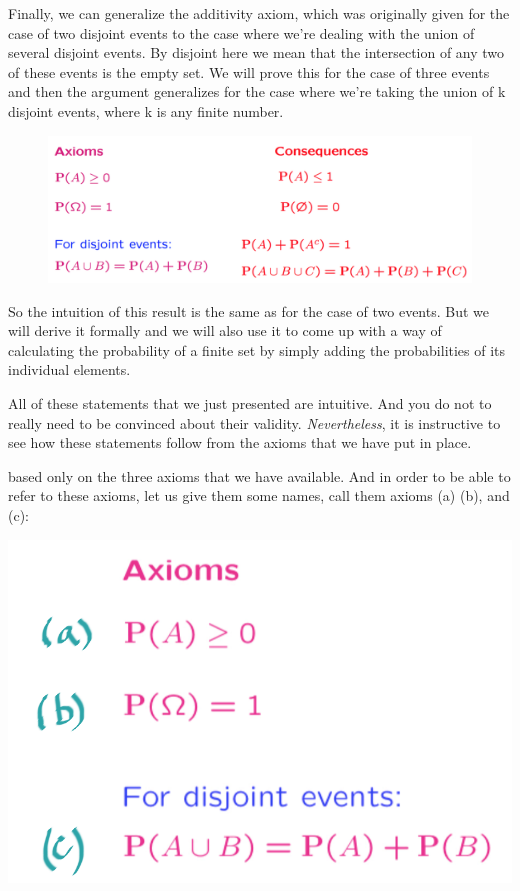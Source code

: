 \documentclass{tufte-handout}
\begin{document}
Finally, we can generalize the additivity axiom, which was originally given for the case of two disjoint
events to the case where we're dealing with the union of several disjoint events. By disjoint here we
mean that the intersection of any two of these events is the empty set. We will prove this for the case of
three events and then the argument generalizes for the case where we're taking the union of k disjoint
events, where k is any finite number.

\begin{figure}
  \includegraphics{AxiomConseq2}
\end{figure}

So the intuition of this result is the same as for the case of two events. But we will derive it formally and
we will also use it to come up with a way of calculating the probability of a finite set by simply adding the
probabilities of its individual elements.


All of these statements that we just presented are intuitive. And you do not to really need to be
convinced about their validity. \textit{Nevertheless}, it is instructive to see how these statements follow from the
axioms that we have put in place.

 based only on the three axioms that we have available. And in
order to be able to refer to these axioms, let us give them some names, call them axioms (a) (b), and (c):

\begin{marginfigure}
  \includegraphics{Axioms}
\end{marginfigure}
\end{document}
